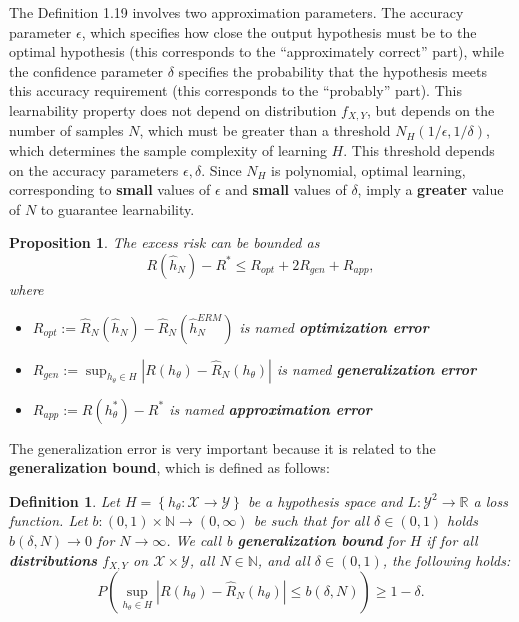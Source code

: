 \documentclass{report}
\newtheorem{definition}{Definition}[chapter]
\newtheorem{proposition}{Proposition}[chapter]
\begin{document}
The Definition 1.19 involves two approximation parameters. The accuracy parameter $\epsilon$, which specifies how close the output hypothesis must be to the optimal hypothesis (this corresponds to the “approximately correct” part), while the confidence parameter $\delta$ specifies the probability that the hypothesis meets this accuracy requirement (this corresponds to the “probably” part). This learnability property does not depend on distribution $f_{X,Y}$, but depends on the number of samples $N$, which must be greater than a threshold $N_H(1/\epsilon,1/\delta)$, which determines the sample complexity of learning $H$. This threshold depends on the accuracy parameters $\epsilon,\delta$. Since $N_H$ is polynomial, optimal learning, corresponding to \textbf{small} values of $\epsilon$ and \textbf{small} values of $\delta$, imply a \textbf{greater} value of $N$ to guarantee learnability.

\begin{proposition}
The excess risk can be bounded as
\begin{equation}
 R(\hat{h}_N)-R^* \leq R_{opt} + 2R_{gen} + R_{app},
\end{equation}
where
\begin{itemize}
\item $R_{opt} := \hat{R}_N(\hat{h}_N)-\hat{R}_N(\hat{h}^{ERM}_N)$ is named \textbf{optimization error}
\item $R_{gen} := \sup_{h_{\theta} \in H}|R(h_\theta)-\hat{R}_N(h_\theta)|$ is named \textbf{generalization error}
\item $R_{app} := R(h^*_\theta)-R^*$ is named \textbf{approximation error}
\end{itemize}
\end{proposition}

The generalization error is very important because it is related to the \textbf{generalization bound}, which is defined as follows:

\begin{definition}
Let $H = \left\{h_\theta : \mathcal{X} \to \mathcal{Y}\right\}$ be a hypothesis space and $L:\mathcal{Y}^2 \to \mathbb{R}$ a loss function. Let $b : (0,1) \times \mathbb{N} \to (0,\infty)$ be such that for all $\delta \in (0,1)$ holds $b(\delta, N) \to 0$ for $N \to \infty$. We call b \textbf{generalization bound} for $H$ if for all \textbf{distributions} $f_{X,Y}$ on $\mathcal{X} \times \mathcal{Y}$, all $N \in \mathbb{N}$, and all $\delta \in (0,1)$, the following holds:
\begin{equation}
P\left(\sup_{h_{\theta} \in H}|R(h_\theta)-\hat{R}_N(h_\theta)|\leq b(\delta, N)\right) \geq 1-\delta.
\end{equation}

\end{definition}
\end{document}
